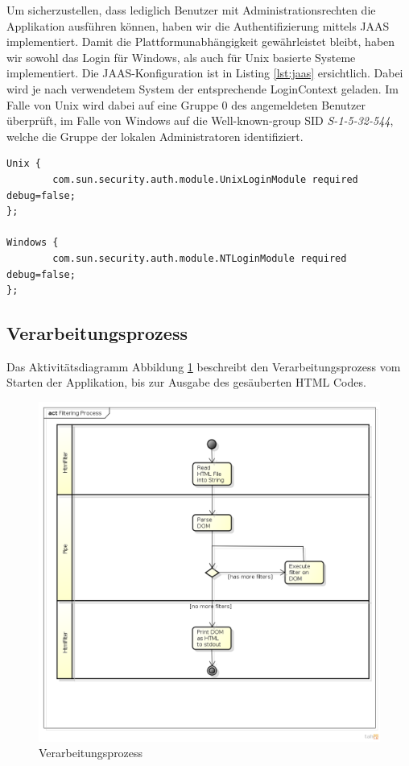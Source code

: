 Um sicherzustellen, dass lediglich Benutzer mit Administrationsrechten die Applikation ausführen können,
haben wir die Authentifizierung mittels JAAS implementiert. Damit die Plattformunabhängigkeit 
gewährleistet bleibt, haben wir sowohl das Login für Windows, als auch für Unix basierte Systeme 
implementiert. Die JAAS-Konfiguration ist in Listing \ref{lst:jaas} ersichtlich. Dabei wird je
nach verwendetem System der entsprechende LoginContext geladen. Im Falle von Unix wird dabei auf eine
Gruppe 0 des angemeldeten Benutzer überprüft, im Falle von Windows auf die Well-known-group 
SID\cite{MS:SID} \textit{S-1-5-32-544}, welche die Gruppe der lokalen Administratoren identifiziert. 
\newline
\begin{lstlisting}[caption="JAAS konfiguration im File jaas\_security.conf", label={lst:jaas}]
Unix {
        com.sun.security.auth.module.UnixLoginModule required debug=false;
};

Windows {
        com.sun.security.auth.module.NTLoginModule required debug=false;
};
\end{lstlisting}

\newpage

\subsection{Verarbeitungsprozess}

Das Aktivitätsdiagramm Abbildung \ref{fig:process} beschreibt den Verarbeitungsprozess vom Starten der Applikation, bis zur Ausgabe des gesäuberten HTML Codes.

\begin{figure}[H]
	\begin{center}
		\includegraphics[width=1.0\textwidth]{./content/Filtering_Process_cut.png}
	\end{center}
	\caption{Verarbeitungsprozess}
	\label{fig:process}
\end{figure}


